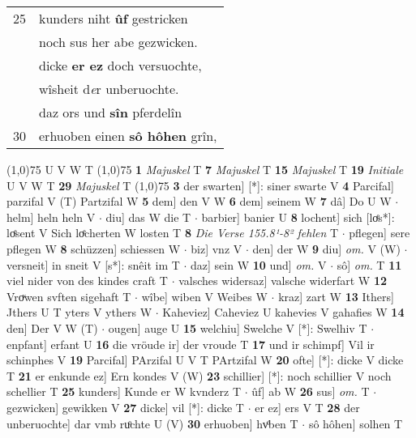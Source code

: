 \documentclass[8pt,a4paper,notitlepage]{article}
\begin{document}
\begin{table}[ht]
\begin{minipage}[t]{0.5\linewidth}
\begin{tabular}{rl}
25 & kunders niht \textbf{ûf} gestricken\\ 
 & noch sus her abe gezwicken.\\ 
 & dicke \textbf{er ez} doch versuochte,\\ 
 & wîsheit d\textit{e}r unberuochte.\\ 
 & daz ors und \textbf{sîn} pferdelîn\\ 
30 & erhuoben einen \textbf{sô hôhen} grîn,\\ 
\end{tabular}
\scriptsize
\line(1,0){75} \newline
U V W T \newline
\line(1,0){75} \newline
\textbf{1} \textit{Majuskel} T  \textbf{7} \textit{Majuskel} T  \textbf{15} \textit{Majuskel} T  \textbf{19} \textit{Initiale} U V W T  \textbf{29} \textit{Majuskel} T  \newline
\line(1,0){75} \newline
\textbf{3} der swarten] [*]: siner swarte V \textbf{4} Parcifal] parzifal V (T) Partzifal W \textbf{5} dem] den V W \textbf{6} dem] seinem W \textbf{7} dâ] Do U W  $\cdot$ helm] heln heln V  $\cdot$ diu] das W die T  $\cdot$ barbier] banier U \textbf{8} lochent] sich [loͤs*]: loͤsent V Sich loͤcherten W losten T \textbf{8} \textit{Die Verse 155.8¹-8² fehlen} T   $\cdot$ pflegen] sere pflegen W \textbf{8} schüzzen] schiessen W  $\cdot$ biz] vnz V  $\cdot$ den] der W \textbf{9} diu] \textit{om.} V (W)  $\cdot$ versneit] in sneit V [s*]: snêit im T  $\cdot$ daz] sein W \textbf{10} und] \textit{om.} V  $\cdot$ sô] \textit{om.} T \textbf{11} viel nider von des kindes craft T  $\cdot$ valsches widersaz] valsche widerfart W \textbf{12} Vroͮwen svften sigehaft T  $\cdot$ wîbe] wiben V Weibes W  $\cdot$ kraz] zart W \textbf{13} Ithers] Jthers U T yters V ythers W  $\cdot$ Kaheviez] Caheviez U kahevies V gahafies W \textbf{14} den] Der V W (T)  $\cdot$ ougen] auge U \textbf{15} welchiu] Swelche V [*]: Swelhiv T  $\cdot$ enpfant] erfant U \textbf{16} die vröude ir] der vroude T \textbf{17} und ir schimpf] Vil ir schinphes V \textbf{19} Parcifal] PArzifal U V T PArtzifal W \textbf{20} ofte] [*]: dicke V dicke T \textbf{21} er enkunde ez] Ern kondes V (W) \textbf{23} schillier] [*]: noch schillier V noch schellier T \textbf{25} kunders] Kunde er W kvnderz T  $\cdot$ ûf] ab W \textbf{26} sus] \textit{om.} T  $\cdot$ gezwicken] gewikken V \textbf{27} dicke] vil [*]: dicke T  $\cdot$ er ez] ers V T \textbf{28} der unberuochte] dar vmb ruͦchte U (V) \textbf{30} erhuoben] hvͦben T  $\cdot$ sô hôhen] solhen T \newline
\end{minipage}
\end{table}
\end{document}
